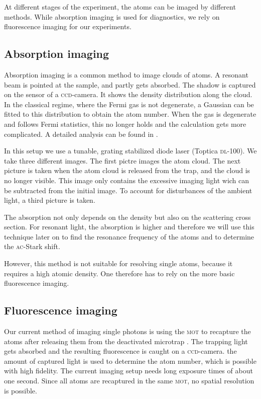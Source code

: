At different stages of the experiment, the atoms can be imaged by different methods. While absorption imaging is used for diagnostics, we rely on fluorescence imaging for our experiments.

\subsection{Absorption imaging}

Absorption imaging is a common method to image clouds of atoms\cite{ketterle}. A resonant beam is pointed at the sample, and partly gets absorbed. The shadow is captured on the sensor of a \textsc{ccd}-camera. It shows the density distribution along the cloud. In the classical regime, where the Fermi gas is not degenerate, a Gaussian can be fitted to this distribution to obtain the atom number. When the gas is degenerate and follows Fermi statistics, this no longer holds and the calculation gets more complicated. A detailed analysis can be found in \cite{ketterle2}.

In this setup we use a tunable, grating stabilized diode laser (Toptica \textsc{dl}-100). We take three different images. The first pictre images the atom cloud. The next picture is taken when the atom cloud is released from the trap, and the cloud is no longer visible. This image only contains the excessive imaging light wich can be subtracted from the initial image. To account for disturbances of the ambient light, a third picture is taken.

The absorption not only depends on the density but also on the scattering cross section. For resonant light, the absorption is higher and therefore we will use this technique later on to find the resonance frequency of the atoms and to determine the \textsc{ac}-Stark shift.

However, this method is not suitable for resolving single atoms, because it requires a high atomic density. One therefore has to rely on the more basic fluorescence imaging.

\subsection{Fluorescence imaging}

Our current method of imaging single photons is using the \textsc{mot} to recapture the atoms after releasing them from the deactivated microtrap \cite{timo}. The trapping light gets absorbed and the resulting fluorescence is caught on a \textsc{ccd}-camera. the amount of captured light is used to determine the atom number, which is possible with high fidelity. The current imaging setup needs long exposure times of about one second. Since all atoms are recaptured in the same \textsc{mot}, no spatial resolution is possible.

